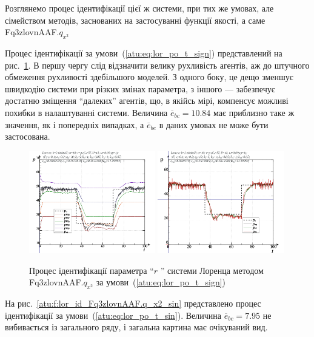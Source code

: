 Розглянемо процес ідентифікації цієї ж системи, при тих же
умовах, але сімейством методів, заснованих на застосуванні
функції якості, а саме
Fq3zlovnAAF.$q_{x^2}$

Процес ідентифікації за умови~(\ref{atu:eq:lor_po_t_sign}) представлений
на рис.~\ref{atu:f:lor_id_Fq3zlovnAAF.q_x2_sign}. В першу чергу слід відзначити
велику рухливість агентів, аж до штучного обмеження рухливості
здебільшого моделей. З одного боку, це дещо зменшує швидкодію
системи при різких змінах параметра, з іншого --- забезпечує
достатню зміщення ``далеких'' агентів, що, в якійсь мірі,
компенсує можливі похибки в налаштуванні системи. Величина
$ \overline{e}_{bc} = 10.84 $ має приблизно таке ж значення, як і попередніх
випадках, а
$ \overline{e}_{be} $ в даних умовах не може бути застосована.

\begin{figure}[ht!]
  \centerline{
    \includegraphics[width=0.49\textwidth]{p/cha/lor/Fq3zlovnAAF/lor_Fq3zlovnAAF_qx2-pl_n_sign.png}
    \hfill
    \includegraphics[width=0.49\textwidth]{p/cha/lor/Fq3zlovnAAF/lor_Fq3zlovnAAF_qx2-p_p_sign.png}
  }
\caption{Процес ідентифікації параметра ``$ r $ '' системи Лоренца методом Fq3zlovnAAF.$q_{x^2} $ за умови~(\ref{atu:eq:lor_po_t_sign})}
\label{atu:f:lor_id_Fq3zlovnAAF.q_x2_sign}
\end{figure}

На рис.~\ref{atu:f:lor_id_Fq3zlovnAAF.q_x2_sin} представлено процес ідентифікації за
умови~(\ref{atu:eq:lor_po_t_sin}). Величина
$ \overline{e}_{bc} = 7.95 $ не вибивається із загального ряду, і загальна
картина має очікуваний вид.

